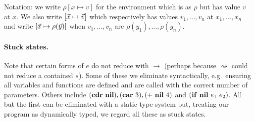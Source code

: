 Notation: we write $\rho[x \mapsto v]$ for the environment which is as
$\rho$ but  has value $v$ at  $x$.  We also  write $[\myvec{x} \mapsto
  \myvec{v}]$  which respectively  has  values $v_1,  \ldots, v_n$  at
$x_1,  \ldots, x_n$  and write  $[\myvec{x}  \mapsto \rho(\myvec{y})]$
when $v_1, \ldots, v_n$ are $\rho(y_1), \ldots, \rho(y_n)$.

\paragraph{Stuck states.} Note that certain forms of $e$ do not reduce
with  $\rightarrow$  (perhaps  because  $\rightsquigarrow$  could  not
reduce a  contained $s$).  Some  of these we  eliminate syntactically,
e.g.\ ensuring all variables and  functions are defined and are called
with the correct number  of parameters.  Others include $(\mbox{$\mathbf{cdr}$}\ \mbox{$\mathbf{ nil}$}),
(\mbox{$\mathbf{car}$}\ 3),  (+\ \mbox{$\mathbf{ nil}$}\ 4)$ and  $(\SIF\ \NIL\ e_1\ e_2)$.   All but the
first can  be eliminated with a  static type system  but, treating our
program as dynamically typed, we regard all these as stuck states.

